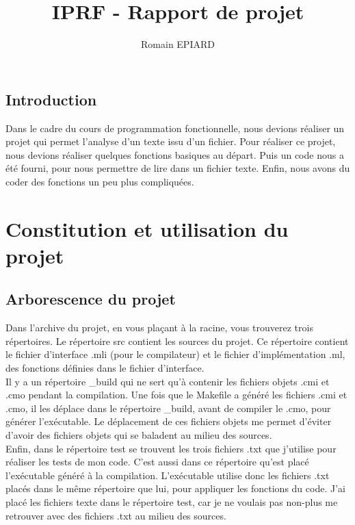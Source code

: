 \documentclass[a4paper, title page, 12pt]{report}
\title{IPRF - Rapport de projet}
\author{Romain EPIARD}
\date{}
\begin{document}
		
		
	\setcounter{page}{1}
	\newpage

	\tableofcontents
	\newpage
	\section*{Introduction}
	Dans le cadre du cours de programmation fonctionnelle, nous devions réaliser un projet qui permet l'analyse d'un texte issu d'un fichier. Pour réaliser ce projet, nous devions réaliser quelques fonctions basiques au départ. Puis un code nous a été fourni, pour nous permettre de lire dans un fichier texte. Enfin, nous avons du coder des fonctions un peu plus compliquées.

	\newpage	
	\chapter{Constitution et utilisation du projet}
	\section{Arborescence du projet}
	Dans l'archive du projet, en vous plaçant à la racine, vous trouverez trois répertoires. Le répertoire src contient les sources du projet. Ce répertoire contient le fichier d'interface .mli (pour le compilateur) et le fichier d'implémentation .ml, des fonctions définies dans le fichier d'interface.\\
	
	Il y a un répertoire \_build qui ne sert qu'à contenir les fichiers objets .cmi et .cmo pendant la compilation. Une fois que le Makefile a généré les fichiers .cmi et .cmo, il les déplace dans le répertoire \_build, avant de compiler le .cmo, pour générer l'exécutable. Le déplacement de ces fichiers objets me permet d'éviter d'avoir des fichiers objets qui se baladent au milieu des sources.\\
	
	Enfin, dans le répertoire test se trouvent les trois fichiers .txt que j'utilise pour réaliser les tests de mon code. C'est aussi dans ce répertoire qu'est placé l'exécutable généré à la compilation. L'exécutable utilise donc les  fichiers .txt placés dans le même répertoire que lui, pour appliquer les 
fonctions du code. J'ai placé les fichiers texte dans le répertoire test, car je ne voulais pas non-plus me retrouver avec des fichiers .txt au milieu des sources.\\
\end{document}
